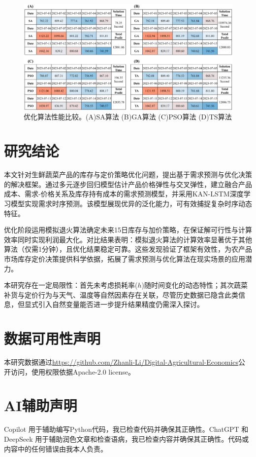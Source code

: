 \documentclass[lang=cn,12pt,a4paper]{elegantpaper}
\begin{document}
\begin{figure}[H]
    \centering
    \includegraphics[width=1\textwidth]{图片9.png}
    \caption{优化算法性能比较。(A)SA算法 (B)GA算法 (C)PSO算法 (D)TS算法}
    \label{fig:fig9}
\end{figure}
\section{研究结论}
\label{sec:conclusions}

本文针对生鲜蔬菜产品的库存与定价策略优化问题，提出基于需求预测与优化决策的解决框架。通过多元逐步回归模型估计产品价格弹性与交叉弹性，建立融合产品成本、需求-价格关系及库存持有成本的需求预测模型，并采用KAN-LSTM深度学习模型实现需求时序预测。该模型展现优异的泛化能力，可有效捕捉复杂时序动态特征。

优化阶段运用模拟退火算法确定未来15日库存与加价策略，在保证解可行性与计算效率同时实现利润最大化。对比结果表明：模拟退火算法的计算效率显著优于其他算法（仅需1分钟），且优化结果稳定可靠。这些发现验证了框架有效性，为农产品市场库存定价决策提供科学依据，拓展了需求预测与优化算法在现实场景的应用潜力。

本研究存在一定局限性：首先未考虑损耗率($h$)随时间变化的动态特性；其次蔬菜补货与定价行为与天气、温度等自然因素存在关联，尽管历史数据已隐含此类信息，但显式引入自然变量能否进一步提升结果精度仍需深入探讨。
\newpage
\section*{数据可用性声明}
本研究数据通过\url{https://github.com/Zhanli-Li/Digital-Agricultural-Economics}公开访问，使用权限依据Apache-2.0 license。
\section*{AI辅助声明}
Copilot 用于辅助编写Python代码，我已检查代码并确保其正确性。ChatGPT 和 DeepSeek 用于辅助润色文章和检查语病，我已检查内容并确保其正确性。代码或内容中的任何错误由我本人负责。
\newpage
\newpage
\nocite{*}
\printbibliography[heading=bibintoc, title=\ebibname]
\newpage
\appendix
\addappheadtotoc
\end{document}
